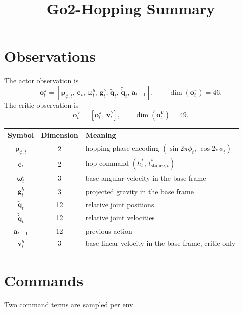 \documentclass[11pt, a4paper]{article}
\title{Go2-Hopping Summary}
\date{}
\begin{document}
\maketitle

\section{Observations}

The actor observation is
\begin{equation}
    \bm{o}^{\pi}_t =
    \left[
        \bm{p}_{\phi,t},\,
        \bm{c}_t,\,
        \bm{\omega}^{b}_t,\,
        \bm{g}^{b}_t,\,
        \tilde{\bm{q}}_t,\,
        \tilde{\dot{\bm{q}}}_t,\,
        \bm{a}_{t-1}
    \right],
    \qquad
    \dim(\bm{o}^{\pi}_t)=46.
\end{equation}
The critic observation is
\begin{equation}
    \bm{o}^{V}_t =
    \left[
        \bm{o}^{\pi}_t,\,
        \bm{v}^{b}_t
    \right],
    \qquad
    \dim(\bm{o}^{V}_t)=49.
\end{equation}

\begin{center}
\begin{tabular}{ccl}
\hline
Symbol & Dimension & Meaning \\
\hline
$\bm{p}_{\phi,t}$ & 2 & hopping phase encoding $(\sin 2\pi\phi_t,\,\cos 2\pi\phi_t)$ \\
$\bm{c}_t$ & 2 & hop command $(h^{*}_t,\,t^{*}_{\mathrm{stance},t})$ \\
$\bm{\omega}^{b}_t$ & 3 & base angular velocity in the base frame \\
$\bm{g}^{b}_t$ & 3 & projected gravity in the base frame \\
$\tilde{\bm{q}}_t$ & 12 & relative joint positions \\
$\tilde{\dot{\bm{q}}}_t$ & 12 & relative joint velocities \\
$\bm{a}_{t-1}$ & 12 & previous action \\
$\bm{v}^{b}_t$ & 3 & base linear velocity in the base frame, critic only \\
\hline
\end{tabular}
\end{center}

\section{Commands}

Two command terms are sampled per env.
\end{document}
